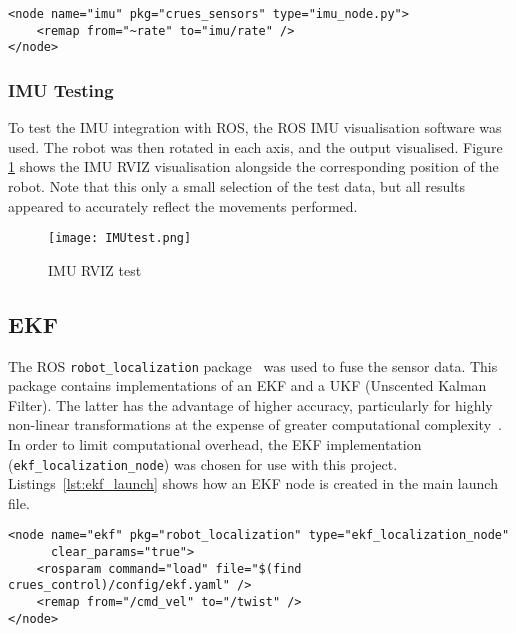 \begin{lstlisting}[caption={IMU node in ROS launch file}, label={lst:imu_launch}, style=xml]
<node name="imu" pkg="crues_sensors" type="imu_node.py">
    <remap from="~rate" to="imu/rate" />
</node>
\end{lstlisting}

\subsubsection{IMU Testing}\label{soft/odometry/imu/test}

To test the IMU integration with ROS, the ROS IMU visualisation software was used.
The robot was then rotated in each axis, and the output visualised.
Figure \ref{fig:imu_test} shows the IMU RVIZ visualisation alongside the
corresponding position of the robot. Note that this only a small selection
of the test data, but all results appeared to accurately reflect the
movements performed.

\begin{figure}[!ht]
	\centering
	\texttt{[image: IMUtest.png]}
	\caption{IMU RVIZ test}\label{fig:imu_test}
\end{figure}

\subsection{EKF}\label{soft/odometry/ekf}

The ROS \verb|robot_localization| package~\cite{RosRobotLocalization} was used
to fuse the sensor data. This package contains implementations of
an EKF and a UKF (Unscented Kalman Filter). The latter has the advantage of higher
accuracy, particularly for highly non-linear transformations at the expense of
greater computational complexity~\cite{wan_unscented_2000}. In order to limit
computational overhead, the EKF implementation (\verb|ekf_localization_node|) was
chosen for use with this project. Listings~\ref{lst:ekf_launch} shows how an EKF
node is created in the main launch file.

\begin{lstlisting}[caption={EKF node in ROS launch file}, label={lst:ekf_launch}, style=xml]
<node name="ekf" pkg="robot_localization" type="ekf_localization_node"
      clear_params="true">
    <rosparam command="load" file="$(find crues_control)/config/ekf.yaml" />
    <remap from="/cmd_vel" to="/twist" />
</node>
\end{lstlisting}

